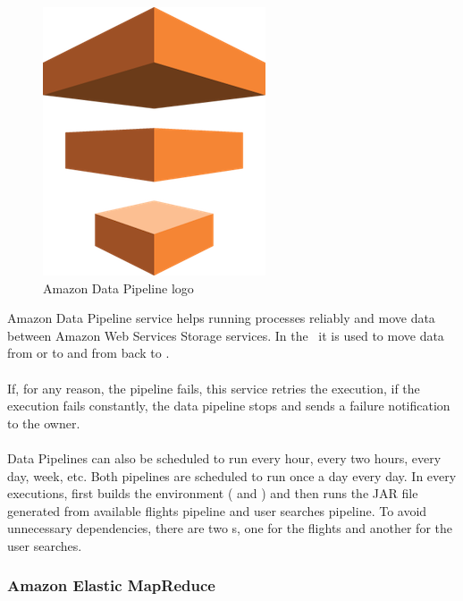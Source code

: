 \begin{figure}[H]
\centering
\includegraphics[scale=0.1]{resources/data_pipeline-logo.png}
\caption{Amazon Data Pipeline logo}
\end{figure}

Amazon Data Pipeline\cite{data_pipeline} service helps running processes reliably and move data between Amazon Web Services Storage services. In the \thesis\ it is used to move data from  or  to  and from  back to .
\\\\
If, for any reason, the pipeline fails, this service retries the execution, if the execution fails constantly, the data pipeline stops and sends a failure notification to the owner.
\\\\
Data Pipelines can also be scheduled to run every hour, every two hours, every day, week, etc. Both pipelines are scheduled to run once a day every day. In every executions, first builds the environment ( and ) and then runs the JAR\cite{jar} file generated from available flights pipeline and user searches pipeline. To avoid unnecessary dependencies, there are two s, one for the flights and another for the user searches.

\subsubsection*{Amazon Elastic MapReduce} \label{emr}

